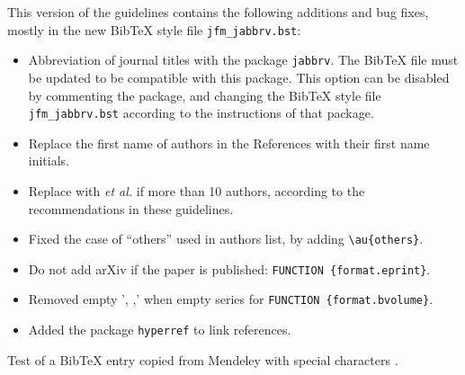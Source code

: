 \documentclass{jfm}
\begin{document}
This version of the guidelines contains the following additions and bug fixes,
mostly in the new BibTeX style file \verb|jfm_jabbrv.bst|:
\begin{itemize}
	\item Abbreviation of journal titles with the package \verb|jabbrv|.
	The BibTeX file must be updated to be compatible with this package.
	This option can be disabled by commenting the package, and changing the
	BibTeX style file \verb|jfm_jabbrv.bst| according to the instructions of that package.
	\item Replace the first name of authors in the References with their first name initials.
	\item Replace with \textit{et al.} if more than 10 authors, according to the recommendations in these guidelines.
	\item Fixed the case of ``others'' used in authors list, by adding \verb|\au{others}|.
	\item Do not add arXiv if the paper is published: \verb|FUNCTION {format.eprint}|.
	\item Removed empty ', ,' when empty series for \verb|FUNCTION {format.bvolume}|.
	\item Added the package \verb|hyperref| to link references.
\end{itemize}

Test of a BibTeX entry copied from Mendeley with special characters \citep{Thoraval2012}.
\end{document}
